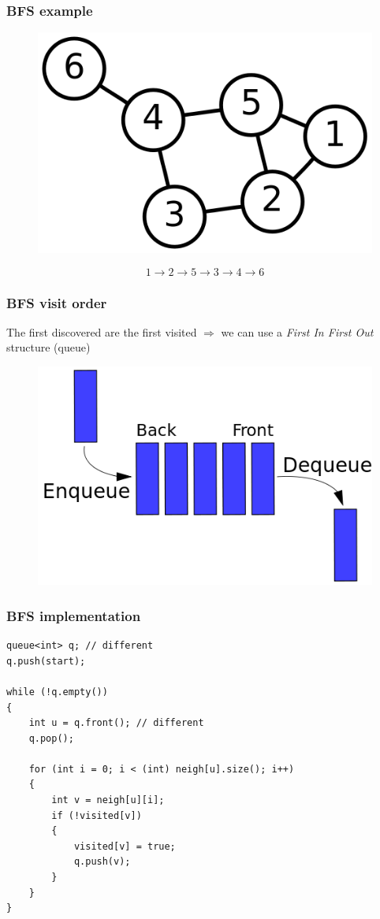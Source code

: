 \documentclass[12pt]{beamer}
\begin{document}
\begin{frame}
\frametitle{BFS example}
\begin{figure}
\centering
\includegraphics[width=.5\linewidth]{img/6n-graph}
\end{figure}
\[ 1 \to 2 \to 5 \to 3 \to 4 \to 6 \]
\end{frame}

\begin{frame}
\frametitle{BFS visit order}
The first discovered are the first visited $\Rightarrow$ we can use a \emph{First In First Out} structure (queue)
\begin{figure}
\centering
\includegraphics[width=.6\linewidth]{img/queue}
\end{figure}
\end{frame}

\begin{frame}[fragile]
\frametitle{BFS implementation}
\begin{lstlisting}
queue<int> q; // different
q.push(start);

while (!q.empty())
{
    int u = q.front(); // different
    q.pop();
    
    for (int i = 0; i < (int) neigh[u].size(); i++)
    {
        int v = neigh[u][i];
        if (!visited[v])
        {
            visited[v] = true;
            q.push(v);
        }
    }
}
\end{lstlisting}
\end{frame}
\end{document}
